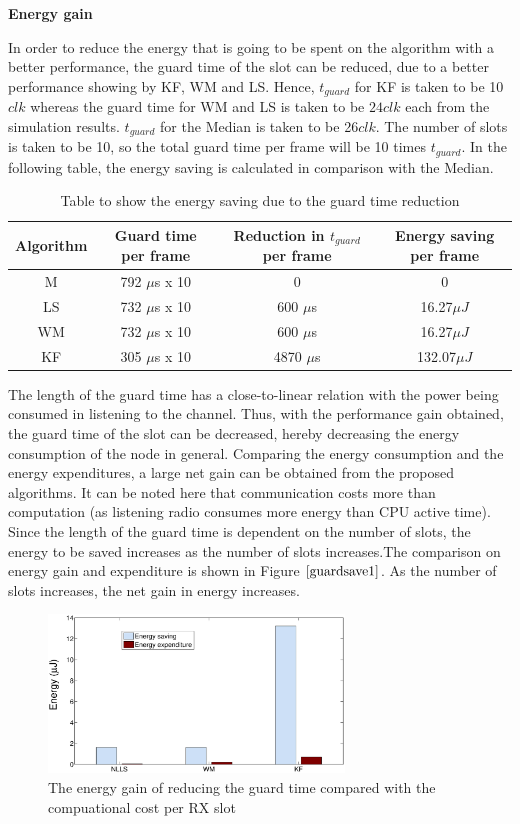 \documentclass[a4paper,10pt]{report}
\begin{document}
\newline
\textbf{Energy gain}\par \noindent
In order to reduce the energy that is going to be spent on the
algorithm with a better performance, the guard time of the slot can
be reduced, due to a better performance showing by KF, WM and LS.
Hence, $t_{guard}$ for KF is taken to be 10$clk$ whereas the guard
time for WM and LS is taken to be $24clk$ each from the simulation
results. $t_{guard}$ for the Median is taken to be 26$clk$. The
number of slots is taken to be 10, so the total guard time per frame
will be 10 times $t_{guard}$. In the following table, the energy
saving is calculated in comparison with the Median.
\begin{table}
        \caption{Table to show the energy saving due to the guard time reduction}
    \begin{tabular}{ |c | c |c | c |  }
    \hline
    Algorithm & Guard time per frame & Reduction in $t_{guard}$ per frame & Energy saving per frame\\ \hline \hline
    M &  792 $\mu$s x 10 & 0 & 0 \\ \hline
    LS & 732 $\mu$s x 10 & 600 $\mu$s & 16.27$\mu J$\\ \hline
    WM &   732 $\mu$s x 10 & 600 $\mu$s & 16.27$\mu J$ \\ \hline
    KF &  305 $\mu$s x 10 & 4870 $\mu$s & 132.07$\mu J$\\ \hline
    \end{tabular}
\label{tab2}
\end{table}
The length of the guard time has a close-to-linear relation with the
power being consumed in listening to the channel. Thus, with the
performance gain obtained, the guard time of the slot can be
decreased, hereby decreasing the energy consumption of the node in
general. Comparing the energy consumption and the energy
expenditures, a large net gain can be obtained from the proposed
algorithms. It can be noted here that communication costs more than
computation (as listening radio consumes more energy than CPU active
time). Since the length of the guard time is dependent on the number
of slots, the energy to be saved increases as the number of slots
increases.\newline The comparison on energy gain and expenditure is
shown in Figure $\ref{guardsave1}$. As the number of slots
increases, the net gain in energy increases.
\begin{figure}[!h]
\centering
\includegraphics[width=0.7\textwidth]{commvscompute}
\caption{The energy gain of reducing the guard time compared with the compuational cost per RX slot}
\label{guardsave1}
\end{figure}
\end{document}
